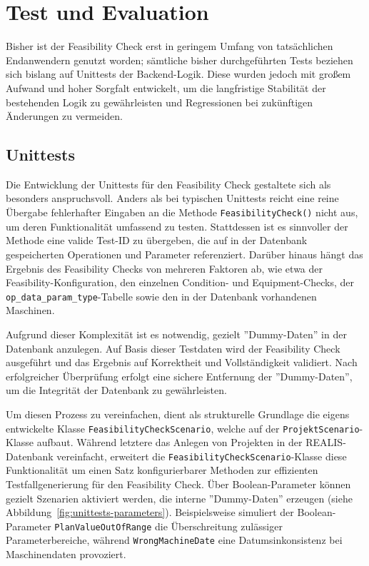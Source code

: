 \chapter{Test und Evaluation}

Bisher ist der Feasibility Check erst in geringem Umfang von tatsächlichen Endanwendern genutzt worden; sämtliche bisher durchgeführten Tests beziehen sich bislang auf Unittests der Backend-Logik. Diese wurden jedoch mit großem Aufwand und hoher Sorgfalt entwickelt, um die langfristige Stabilität der bestehenden Logik zu gewährleisten und Regressionen bei zukünftigen Änderungen zu vermeiden.

\section{Unittests}

Die Entwicklung der Unittests für den Feasibility Check gestaltete sich als besonders anspruchsvoll. Anders als bei typischen Unittests reicht eine reine Übergabe fehlerhafter Eingaben an die Methode \texttt{FeasibilityCheck()} nicht aus, um deren Funktionalität umfassend zu testen. Stattdessen ist es sinnvoller der Methode eine valide Test-ID zu übergeben, die auf in der Datenbank gespeicherten Operationen und Parameter referenziert. Darüber hinaus hängt das Ergebnis des Feasibility Checks von mehreren Faktoren ab, wie etwa der Feasibility-Konfiguration, den einzelnen Condition- und Equipment-Checks, der \texttt{op\_data\_param\_type}-Tabelle sowie den in der Datenbank vorhandenen Maschinen.

Aufgrund dieser Komplexität ist es notwendig, gezielt ''Dummy-Daten'' in der Datenbank anzulegen. Auf Basis dieser Testdaten wird der Feasibility Check ausgeführt und das Ergebnis auf Korrektheit und Vollständigkeit validiert. Nach erfolgreicher Überprüfung erfolgt eine sichere Entfernung der ''Dummy-Daten'', um die Integrität der Datenbank zu gewährleisten.

Um diesen Prozess zu vereinfachen, dient als strukturelle Grundlage die eigens entwickelte Klasse \texttt{FeasibilityCheckScenario}, welche auf der \texttt{ProjektScenario}-Klasse aufbaut. Während letztere das Anlegen von Projekten in der REALIS-Datenbank vereinfacht, erweitert die \texttt{FeasibilityCheckScenario}-Klasse diese Funktionalität um einen Satz konfigurierbarer Methoden zur effizienten Testfallgenerierung für den Feasibility Check. Über Boolean-Parameter können gezielt Szenarien aktiviert werden, die interne ''Dummy-Daten'' erzeugen (siehe Abbildung~\ref{fig:unittests-parameters}). Beispielsweise simuliert der Boolean-Parameter \texttt{PlanValueOutOfRange} die Überschreitung zulässiger Parameterbereiche, während \texttt{WrongMachineDate} eine Datumsinkonsistenz bei Maschinendaten provoziert.

